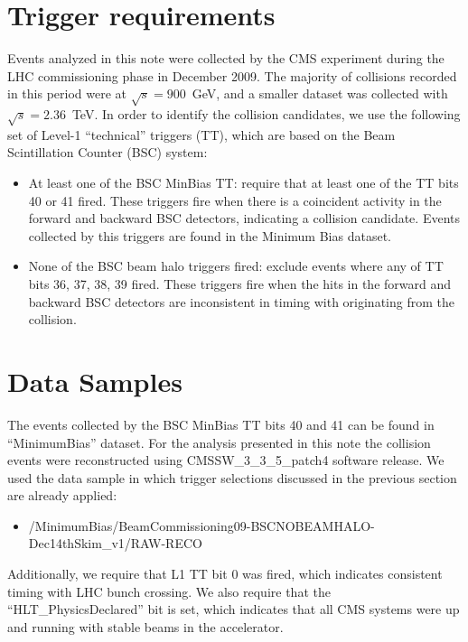 \usepackage{multirow}
\usepackage{subfigure}  %

\section{Trigger requirements}
\label{sc:TriggerRequirements}

Events analyzed in this note were collected by the CMS experiment during the LHC
commissioning phase in December 2009. The majority of collisions
recorded in this period were at $\sqrt{s}=900$~GeV, and a
smaller dataset was collected with $\sqrt{s}=2.36$~TeV. In order to
identify the collision candidates, we use the following
set of Level-1 ``technical'' triggers (TT), which are based on the Beam Scintillation
Counter (BSC) system:

\begin{itemize}
\item At least one of the BSC MinBias TT: require that at least one of
  the TT bits 40 or 41 fired. These triggers fire when there is a
  coincident activity in the forward and backward BSC detectors,
  indicating a collision candidate. Events collected by this triggers are found in the Minimum Bias dataset.

\item None of the BSC beam halo triggers fired: exclude events where any
  of TT bits 36, 37, 38, 39 fired. These triggers fire when the hits in
  the forward and backward BSC detectors are inconsistent in timing with
  originating from the collision.
\end{itemize}

\section{Data Samples}
\label{sc:DataSamples}

The events collected by the BSC MinBias TT bits 40 and 41 can be found
in ``MinimumBias'' dataset. For the analysis presented in this note the
collision events were reconstructed using CMSSW\_3\_3\_5\_patch4
software release. We used the data sample in which trigger selections
discussed in the previous section are already applied:
\begin{itemize}
\item
  /MinimumBias/BeamCommissioning09-BSCNOBEAMHALO-Dec14thSkim\_v1/RAW-RECO
\end{itemize}
Additionally, we require that L1 TT bit 0 was fired, which
indicates consistent timing with LHC bunch crossing. We also require
that the ``HLT\_PhysicsDeclared'' bit is set, which indicates that all
CMS systems were up and running with stable beams in the
accelerator. 

